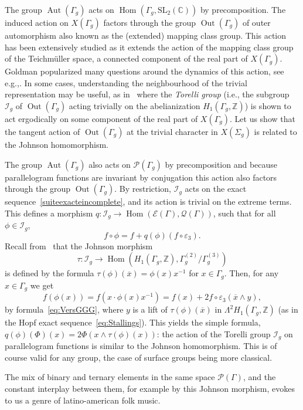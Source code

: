 \documentclass[11pt]{article}
\newcommand{\ie}{i.e.,\xspace}
\newcommand{\eg}{e.g.,\xspace}
\let\mathcal\mathscr
\theoremstyle{definition}
\newcommand{\ZZ}{\mathbb{Z}}
\newcommand{\CC}{\mathbb{C}}
\newcommand{\SL}{\mathrm{SL}}
\newcommand{\Aut}{\operatorname{Aut}}
\newcommand{\Out}{\operatorname{Out}}
\newcommand{\Hom}{\operatorname{Hom}}
\begin{document}
The group $\Aut(\Gamma_g)$ acts on $\Hom(\Gamma_g,\SL_2(\CC))$ by precomposition.
The induced action on $X(\Gamma_g)$ factors through the group
$\operatorname{Out}(\Gamma_g)$ of outer automorphism also known as the
(extended) mapping class group. This action has been extensively studied as
it extends the action of the mapping class group of the Teichmüller space,
a connected component of the real part of $X(\Gamma_g)$.
Goldman popularized many questions around the dynamics of this action,
see \eg \cite{goldman06}.
In some cases, understanding the neighbourhood of the trivial representation
may be useful, as in~\cite{FunarMarche} where the
{\em Torelli group} (\ie the subgroup
$\mathcal{I}_g$ of $\operatorname{Out}(\Gamma_g)$ acting trivially on
the abelianization $H_1(\Gamma_g,\ZZ)$) is shown to
act ergodically on some component of the real part of $X(\Gamma_g)$.
Let us show that the tangent action of $\Out(\Gamma_g)$ at the trivial
character in $X(\Sigma_g)$ is related to the Johnson homomorphism.

The group $\Aut(\Gamma_g)$ also acts on $\mathcal{P}(\Gamma_g)$
by precomposition and because parallelogram functions are invariant by
conjugation this action also factors through the group
$\operatorname{Out}(\Gamma_g)$.
By restriction, $\mathcal{I}_g$ acts on the exact
sequence~\eqref{suiteexacteincomplete},
and its action is trivial
on the extreme terms.
This
defines a morphism
$q\colon\mathcal{I}_g\to\Hom(\mathcal{E}(\Gamma),\mathcal{Q}(\Gamma))$,
such that for all $\phi\in\mathcal{I}_g$,
\[ f\circ\phi=f+q(\phi)(f\circ\varepsilon_3). \]
Recall from~\cite[Chap.\,6]{farbmargalit} that the Johnson morphism
\[
\tau:\mathcal{I}_g\to \Hom(H_1(\Gamma_g,\ZZ),\Gamma_g^{(2)}/\Gamma_g^{(3)})
\]
is defined by the formula $\tau(\phi)(\overline{x})=\phi(x)x^{-1}$ for
$x\in\Gamma_g$. Then, for any $x\in \Gamma_g$ we get
\[ f(\phi(x))=f(x\cdot \phi(x)x^{-1})=
f(x)+2f\circ\varepsilon_3(\overline{x}\wedge y), \]
by formula~\eqref{eq:VersGGG}, where $y$ is a lift of
$\tau(\phi)(\overline{x})$ in $\Lambda^2 H_1(\Gamma_g,\ZZ)$
(as in the Hopf exact sequence~\eqref{eq:Stallings}). This yields the simple
formula, $q(\phi)(\Phi)(x)=2\Phi(x\wedge \tau(\phi)(x))$: the action of the
Torelli group $\mathcal{I}_g$ on parallelogram functions is similar to the
Johnson homomorphism. This is of course valid for any group, the case of
surface groups being more classical.

The mix of binary and ternary elements in the same space
$\mathcal{P}(\Gamma)$, and the constant interplay between them, for example
by this Johnson morphism, evokes to us a genre of latino-american folk music.
\end{document}
